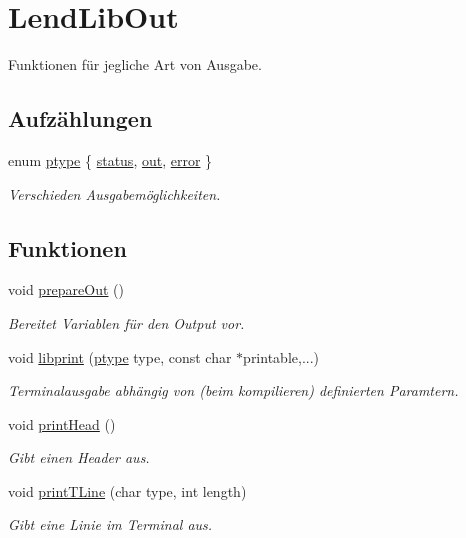 \hypertarget{group___lend_lib_out}{}\section{Lend\+Lib\+Out}
\label{group___lend_lib_out}


Funktionen für jegliche Art von Ausgabe.  


\subsection*{Aufzählungen}
\begin{DoxyCompactItemize}
\item 
enum \hyperlink{group___lend_lib_out_ga0916607956575302a93dbd21440edc1a}{ptype} \{ \hyperlink{group___lend_lib_out_gga0916607956575302a93dbd21440edc1aa9a6940c3bba41cdd6dacae1a00176a30}{status}, 
\hyperlink{group___lend_lib_out_gga0916607956575302a93dbd21440edc1aaaca14bf8f96bb2b357f12496b7f11579}{out}, 
\hyperlink{group___lend_lib_out_gga0916607956575302a93dbd21440edc1aad606e435413ea0944dd00d49e901e4ed}{error}
 \}\begin{DoxyCompactList}\small\item\em Verschieden Ausgabemöglichkeiten. \end{DoxyCompactList}
\end{DoxyCompactItemize}
\subsection*{Funktionen}
\begin{DoxyCompactItemize}
\item 
void \hyperlink{group___lend_lib_out_gae6bfc3bcebb80e387b4ad8a773496437}{prepare\+Out} ()
\begin{DoxyCompactList}\small\item\em Bereitet Variablen für den Output vor. \end{DoxyCompactList}\item 
void \hyperlink{group___lend_lib_out_ga152ba05f7c1a27f69bd9c243359609c6}{libprint} (\hyperlink{group___lend_lib_out_ga0916607956575302a93dbd21440edc1a}{ptype} type, const char $\ast$printable,...)
\begin{DoxyCompactList}\small\item\em Terminalausgabe abhängig von (beim kompilieren) definierten Paramtern. \end{DoxyCompactList}\item 
void \hyperlink{group___lend_lib_out_ga903241157072885e802dea85fc6a976c}{print\+Head} ()
\begin{DoxyCompactList}\small\item\em Gibt einen Header aus. \end{DoxyCompactList}\item 
void \hyperlink{group___lend_lib_out_ga5a511942adfe4ce80256d665208eb204}{print\+T\+Line} (char type, int length)
\begin{DoxyCompactList}\small\item\em Gibt eine Linie im Terminal aus. \end{DoxyCompactList}\end{DoxyCompactItemize}


